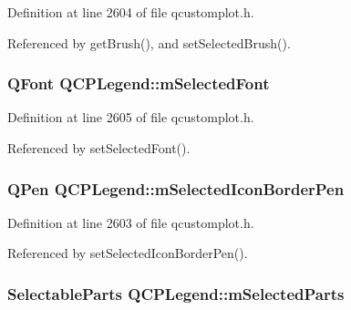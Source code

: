 Definition at line 2604 of file qcustomplot.\+h.



Referenced by get\+Brush(), and set\+Selected\+Brush().

\hypertarget{class_q_c_p_legend_a86ce8f6c20a2f51a48eaf3c24ce16805}{}
\subsubsection[{m\+Selected\+Font}]{\setlength{\rightskip}{0pt plus 5cm}Q\+Font Q\+C\+P\+Legend\+::m\+Selected\+Font\hspace{0.3cm}{\ttfamily [protected]}}\label{class_q_c_p_legend_a86ce8f6c20a2f51a48eaf3c24ce16805}


Definition at line 2605 of file qcustomplot.\+h.



Referenced by set\+Selected\+Font().

\hypertarget{class_q_c_p_legend_a7429ac0e64c7b90b649b4d8f4cc5fa55}{}
\subsubsection[{m\+Selected\+Icon\+Border\+Pen}]{\setlength{\rightskip}{0pt plus 5cm}Q\+Pen Q\+C\+P\+Legend\+::m\+Selected\+Icon\+Border\+Pen\hspace{0.3cm}{\ttfamily [protected]}}\label{class_q_c_p_legend_a7429ac0e64c7b90b649b4d8f4cc5fa55}


Definition at line 2603 of file qcustomplot.\+h.



Referenced by set\+Selected\+Icon\+Border\+Pen().

\hypertarget{class_q_c_p_legend_a917a34dd2856baafd8d56852d94d00e2}{}
\subsubsection[{m\+Selected\+Parts}]{\setlength{\rightskip}{0pt plus 5cm}Selectable\+Parts Q\+C\+P\+Legend\+::m\+Selected\+Parts\hspace{0.3cm}{\ttfamily [protected]}}\label{class_q_c_p_legend_a917a34dd2856baafd8d56852d94d00e2}


